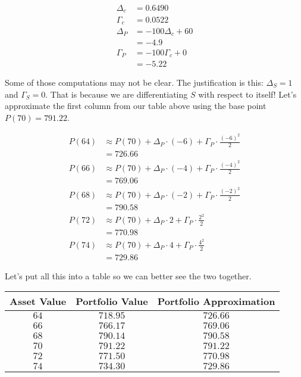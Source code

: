 \documentclass{ximera}
\begin{document}
\begin{align*}
\Delta_c 		&=0.6490\\
\Gamma_c 		&=0.0522\\
\Delta_P 		&=-100\Delta_c+60\\
			&=-4.9\\
\Gamma_P 		&=-100\Gamma_c+0\\
			&=-5.22
\end{align*}

Some of those computations may not be clear. The justification is this: $\Delta_S=1$ and $\Gamma_S=0$. That is because we are differentiating $S$ with respect to itself! Let's approximate the first column from our table above using the base point $P(70)=791.22$.

\begin{align*}
P(64) 		&\approx P(70)+\Delta_P\cdot (-6)+\Gamma_P\cdot\frac{(-6)^2}{2}\\
		&=726.66\\
P(66) 		&\approx P(70)+\Delta_P\cdot (-4)+\Gamma_P\cdot\frac{(-4)^2}{2}\\
		&=769.06\\
P(68) 		&\approx P(70)+\Delta_P\cdot (-2)+\Gamma_P\cdot\frac{(-2)^2}{2}\\
		&=790.58\\
P(72) 		&\approx P(70)+\Delta_P\cdot 2+\Gamma_P\cdot\frac{2^2}{2}\\
		&=770.98\\
P(74) 		&\approx P(70)+\Delta_P\cdot 4+\Gamma_P\cdot\frac{4^2}{2}\\
		&=729.86
\end{align*}

Let's put all this into a table so we can better see the two together.

\begin{center}
	\begin{tabular}{c|cc}
	Asset Value 	& Portfolio Value 	&Portfolio Approximation\\
	\hline
	$64$		& $718.95$		& $726.66$		\\
	$66$		& $766.17$		& $769.06$		\\
	$68$		& $790.14$		& $790.58$		\\
	$70$		& $791.22$		& $791.22$		\\
	$72$		& $771.50$		& $770.98$		\\
	$74$		& $734.30$		& $729.86$		
	\end{tabular}
\end{center}
\end{document}
